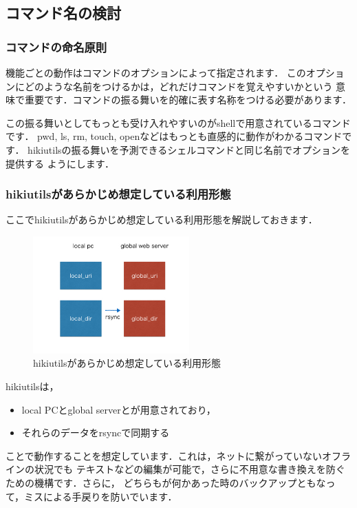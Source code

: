 
\subsection{コマンド名の検討}
\subsubsection{コマンドの命名原則}
機能ごとの動作はコマンドのオプションによって指定されます．
このオプションにどのような名前をつけるかは，どれだけコマンドを覚えやすいかという
意味で重要です．コマンドの振る舞いを的確に表す名称をつける必要があります．

この振る舞いとしてもっとも受け入れやすいのがshellで用意されているコマンドです．
pwd, ls, rm, touch, openなどはもっとも直感的に動作がわかるコマンドです．
hikiutilsの振る舞いを予測できるシェルコマンドと同じ名前でオプションを提供する
ようにします．

\subsubsection{hikiutilsがあらかじめ想定している利用形態}
ここでhikiutilsがあらかじめ想定している利用形態を解説しておきます．

\begin{figure}[htbp]\begin{center}
\includegraphics[width=6cm,bb=0 0 442 500]{../figs/./hikiutils_yamane_09_copy.002.jpg}
\caption{hikiutilsがあらかじめ想定している利用形態}
\label{default}\end{center}\end{figure}
hikiutilsは，

\begin{itemize}
\item local PCとglobal serverとが用意されており，
\item それらのデータをrsyncで同期する
\end{itemize}
ことで動作することを想定しています．これは，ネットに繋がっていないオフラインの状況でも
テキストなどの編集が可能で，さらに不用意な書き換えを防ぐための機構です．さらに，
どちらもが何かあった時のバックアップともなって，ミスによる手戻りを防いでいます．

